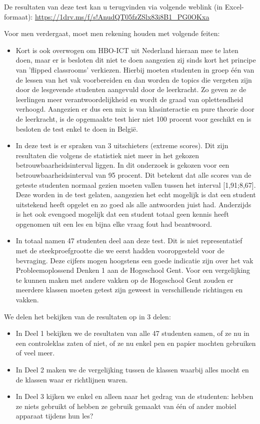 De resultaten van deze test kan u terugvinden via volgende weblink (in Excel-formaat): \url{https://1drv.ms/f/s!AnudQT05fzZSlx83i8B1_PG0OKxa}

Voor men verdergaat, moet men rekening houden met volgende feiten:
\begin{itemize}
	\item Kort is ook overwogen om HBO-ICT uit Nederland hieraan mee te laten doen, maar er is besloten dit niet te doen aangezien zij sinds kort het principe van 'flipped classrooms' verkiezen. Hierbij moeten studenten in groep één van de lessen van het vak voorbereiden en dan worden de topics die vergeten zijn door de lesgevende studenten aangevuld door de leerkracht. Zo geven ze de leerlingen meer verantwoordelijkheid en wordt de graad van oplettendheid verhoogd. Aangezien er dus een mix is van klasinteractie en pure theorie door de leerkracht, is de opgemaakte test hier niet 100 procent voor geschikt en is besloten de test enkel te doen in België.
	\item In deze test is er spraken van 3 uitschieters (extreme scores). Dit zijn resultaten die volgens de statistiek niet meer in het gekozen betrouwbaarheidsinterval liggen. In dit onderzoek is gekozen voor een betrouwbaarheidsinterval van 95 procent. Dit betekent dat alle scores van de geteste studenten normaal gezien moeten vallen tussen het interval [1,91;8,67]. Deze worden in de test gelaten, aangezien het echt mogelijk is dat een student uitstekend heeft opgelet en zo goed als alle antwoorden juist had. Anderzijds is het ook evengoed mogelijk dat een student totaal geen kennis heeft opgenomen uit een les en bijna elke vraag fout had beantwoord.
	\item In totaal namen 47 studenten deel aan deze test. Dit is niet representatief met de steekproefgrootte die we eerst hadden vooropgesteld voor de bevraging. Deze cijfers mogen hoogstens een goede indicatie zijn over het vak Probleemoplossend Denken 1 aan de Hogeschool Gent. Voor een vergelijking te kunnen maken met andere vakken op de Hogeschool Gent zouden er meerdere klassen moeten getest zijn geweest in verschillende richtingen en vakken.
\end{itemize}

We delen het bekijken van de resultaten op in 3 delen:

\begin{itemize}
	\item In Deel 1 bekijken we de resultaten van alle 47 studenten samen, of ze nu in een controleklas zaten of niet, of ze nu enkel pen en papier mochten gebruiken of veel meer.
	\item In Deel 2 maken we de vergelijking tussen de klassen waarbij alles mocht en de klassen waar er richtlijnen waren.
	\item In Deel 3 kijken we enkel en alleen naar het gedrag van de studenten: hebben ze niets gebruikt of hebben ze gebruik gemaakt van één of ander mobiel apparaat tijdens hun les?
\end{itemize}

